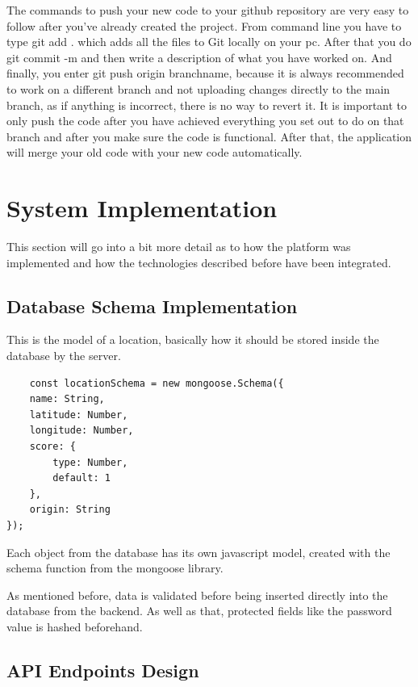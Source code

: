 \documentclass[12pt,a4paper]{report}
\begin{document}
The commands to push your new code to your github repository are very easy to follow after you've already created the project. From command line you have to type git add . which adds all the files to Git locally on your pc. After that you do git commit -m and then write a description of what you have worked on. And finally, you enter git push origin branchname, because it is always recommended to work on a different branch and not uploading changes directly to the main branch, as if anything is incorrect, there is no way to revert it. It is important to only push the code after you have achieved everything you set out to do on that branch and after you make sure the code is functional. After that, the application will merge your old code with your new code automatically.

\section{System Implementation}

This section will go into a bit more detail as to how the platform was implemented and how the technologies described before have been integrated.

\subsection{Database Schema Implementation}

This is the model of a location, basically how it should be stored inside the database by the server.

\begin{lstlisting}
    const locationSchema = new mongoose.Schema({
    name: String,
    latitude: Number,
    longitude: Number,
    score: {
        type: Number,
        default: 1
    },
    origin: String
});
\end{lstlisting}

Each object from the database has its own javascript model, created with the schema function from the mongoose library.

As mentioned before, data is validated before being inserted directly into the database from the backend. As well as that, protected fields like the password value is hashed beforehand.

\subsection{API Endpoints Design}
\end{document}
